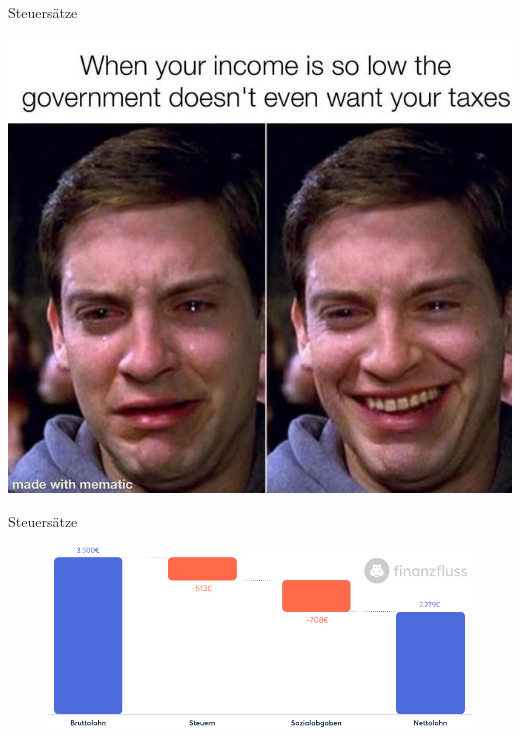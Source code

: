 \documentclass{beamer}
\begin{document}
			\begin{frame}{Steuersätze}
				\begin{center}
					\includegraphics[height=0.85\textheight]{images/meme-low-income.jpg}
				\end{center}
			\end{frame}
		
			\begin{frame}{Steuersätze}
				\begin{center}
					\vspace{-0.5cm}
					\begin{figure}
						\includegraphics[width=0.8\linewidth]{images/steuerrechner}
					\end{figure}
				\end{center}
			\end{frame}
			
\end{document}
